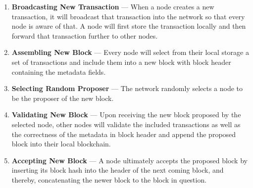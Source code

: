 \begin{enumerate}
	\item \textbf{Broadcasting New Transaction} ---  When a node creates a new transaction, it will broadcast that transaction into the network so that every node is aware of that. A node will first store the transaction locally and then forward that transaction further to other nodes.
	\item \textbf{Assembling New Block} --- Every node will select from their local storage a set of transactions and include them into a new block with block header containing the metadata fields.
	\item \textbf{Selecting Random Proposer} --- The network randomly selects a node to be the proposer of the new block. 
	\item \textbf{Validating New Block} --- Upon receiving the new block proposed by the selected node, other nodes will validate the included transactions as well as the correctness of the metadata in block header and append the proposed block into their local blockchain.
	\item \textbf{Accepting New Block} --- A node ultimately accepts the proposed block by inserting its block hash into the header of the next coming block, and thereby, concatenating the newer block to the block in question.  
\end{enumerate}


